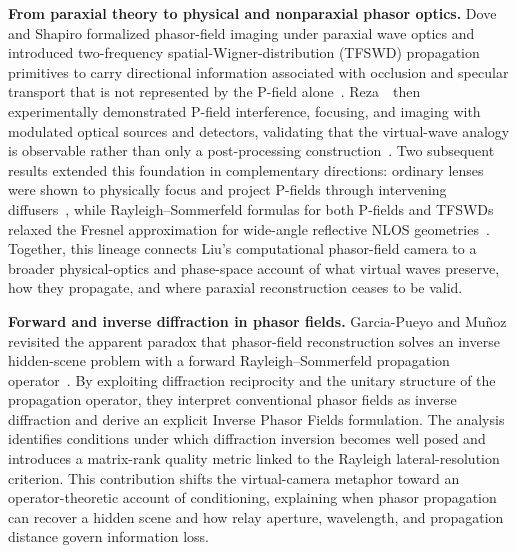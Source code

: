 \vspace{0.8mm}
\noindent \textbf{From paraxial theory to physical and nonparaxial phasor optics.}
Dove and Shapiro formalized phasor-field imaging under paraxial wave optics and introduced two-frequency spatial-Wigner-distribution (TFSWD) propagation primitives to carry directional information associated with occlusion and specular transport that is not represented by the P-field alone~\cite{doveParaxialTheoryPhasor2019}. Reza~\etal~then experimentally demonstrated P-field interference, focusing, and imaging with modulated optical sources and detectors, validating that the virtual-wave analogy is observable rather than only a post-processing construction~\cite{rezaPhasorFieldExperimental2019}. Two subsequent results extended this foundation in complementary directions: ordinary lenses were shown to physically focus and project P-fields through intervening diffusers~\cite{doveParaxialPhysicalOptics2020}, while Rayleigh--Sommerfeld formulas for both P-fields and TFSWDs relaxed the Fresnel approximation for wide-angle reflective NLOS geometries~\cite{doveNonparaxialPhasor2020}. Together, this lineage connects Liu's computational phasor-field camera to a broader physical-optics and phase-space account of what virtual waves preserve, how they propagate, and where paraxial reconstruction ceases to be valid.

\vspace{0.8mm}
\noindent \textbf{Forward and inverse diffraction in phasor fields.}
Garcia-Pueyo and Mu\~noz revisited the apparent paradox that phasor-field reconstruction solves an inverse hidden-scene problem with a forward Rayleigh--Sommerfeld propagation operator~\cite{garciaPueyoForwardInversePhasor2025}. By exploiting diffraction reciprocity and the unitary structure of the propagation operator, they interpret conventional phasor fields as inverse diffraction and derive an explicit Inverse Phasor Fields formulation. The analysis identifies conditions under which diffraction inversion becomes well posed and introduces a matrix-rank quality metric linked to the Rayleigh lateral-resolution criterion. This contribution shifts the virtual-camera metaphor toward an operator-theoretic account of conditioning, explaining when phasor propagation can recover a hidden scene and how relay aperture, wavelength, and propagation distance govern information loss.

